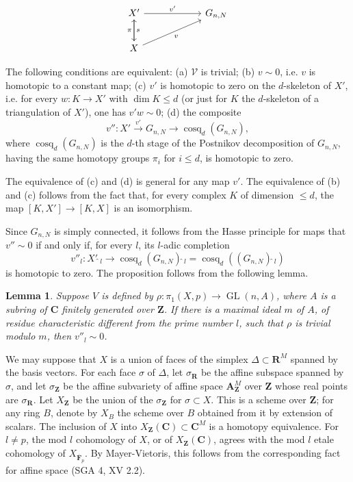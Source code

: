 \documentclass[11pt]{amsart}
\theoremstyle{plain}
\newtheorem*{lemma*}{Lemma}
\theoremstyle{definition}
\theoremstyle{remark}
\DeclareMathOperator{\GL}{GL}
\DeclareMathOperator{\cosq}{cosq}
\providecommand{\Z}{\mathbf Z}
\providecommand{\C}{\mathbf C}
\providecommand{\R}{\mathbf R}
\begin{document}
\[
\begin{tikzcd}[row sep=2em,column sep=3em]
X' \arrow[rr,"v'"] \arrow[d,"\pi"'] && G_{n,N}\\
X \arrow[u,"s"'] \arrow[urr,"v"'] &&
\end{tikzcd}
\]

The following conditions are equivalent: (a) $\mathscr V$ is trivial; (b) $v\sim0$, i.e. $v$ is homotopic to a constant map; (c) $v'$ is homotopic to zero on the $d$-skeleton of $X'$, i.e. for every $w:K\to X'$ with $\dim K\le d$ (or just for $K$ the $d$-skeleton of a triangulation of $X'$), one has $v'w\sim0$; (d) the composite
\[
v'':X'\xrightarrow{v'}G_{n,N}\to \cosq_d(G_{n,N}),
\]
where $\cosq_d(G_{n,N})$ is the $d$-th stage of the Postnikov decomposition of $G_{n,N}$, having the same homotopy groups $\pi_i$ for $i\le d$, is homotopic to zero.

The equivalence of (c) and (d) is general for any map $v'$. The equivalence of (b) and (c) follows from the fact that, for every complex $K$ of dimension $\le d$, the map $[K,X']\to[K,X]$ is an isomorphism.

Since $G_{n,N}$ is simply connected, it follows from the Hasse principle for maps \cite[Theorem 3.1]{SullivanMaps} that $v''\sim0$ if and only if, for every $l$, its $l$-adic completion
\[
v''_l:X'\widehat{\ }_l\to \cosq_d(G_{n,N})\widehat{\ }_l=\cosq_d((G_{n,N})\widehat{\ }_l)
\]
is homotopic to zero. The proposition follows from the following lemma.

\begin{lemma*}
Suppose $V$ is defined by $\rho:\pi_1(X,p)\to\GL(n,A)$, where $A$ is a subring of $\C$ finitely generated over $\Z$. If there is a maximal ideal $m$ of $A$, of residue characteristic different from the prime number $l$, such that $\rho$ is trivial modulo $m$, then $v''_l\sim0$.
\end{lemma*}

We may suppose that $X$ is a union of faces of the simplex $\Delta\subset\R^M$ spanned by the basis vectors. For each face $\sigma$ of $\Delta$, let $\sigma_\R$ be the affine subspace spanned by $\sigma$, and let $\sigma_\Z$ be the affine subvariety of affine space $\mathbf A^M_\Z$ over $\Z$ whose real points are $\sigma_\R$. Let $X_\Z$ be the union of the $\sigma_\Z$ for $\sigma\subset X$. This is a scheme over $\Z$; for any ring $B$, denote by $X_B$ the scheme over $B$ obtained from it by extension of scalars. The inclusion of $X$ into $X_\Z(\C)\subset\C^M$ is a homotopy equivalence. For $l\neq p$, the mod $l$ cohomology of $X$, or of $X_\Z(\C)$, agrees with the mod $l$ etale cohomology of $X_{\overline{\mathbf F}_p}$. By Mayer-Vietoris, this follows from the corresponding fact for affine space (SGA 4, XV 2.2).
\end{document}
